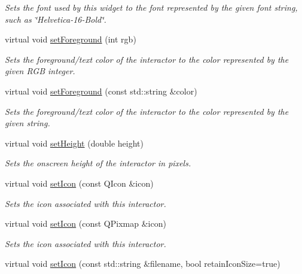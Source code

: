 \begin{DoxyCompactItemize}
\begin{DoxyCompactList}\small\item\em Sets the font used by this widget to the font represented by the given font string, such as \char`\"{}\+Helvetica-\/16-\/\+Bold\char`\"{}. \end{DoxyCompactList}\item 
virtual void \mbox{\hyperlink{classsgl_1_1GInteractor_a9eb856b5ff83a19df3831a31f15f4563}{set\+Foreground}} (int rgb)
\begin{DoxyCompactList}\small\item\em Sets the foreground/text color of the interactor to the color represented by the given R\+GB integer. \end{DoxyCompactList}\item 
virtual void \mbox{\hyperlink{classsgl_1_1GInteractor_af59209aeadea6dfc6d97a2d8531f50e1}{set\+Foreground}} (const std\+::string \&color)
\begin{DoxyCompactList}\small\item\em Sets the foreground/text color of the interactor to the color represented by the given string. \end{DoxyCompactList}\item 
virtual void \mbox{\hyperlink{classsgl_1_1GInteractor_a9e280bfc4544dfaf8e4376c4e1a74357}{set\+Height}} (double height)
\begin{DoxyCompactList}\small\item\em Sets the onscreen height of the interactor in pixels. \end{DoxyCompactList}\item 
virtual void \mbox{\hyperlink{classsgl_1_1GInteractor_a542abfcd7261751352af129c7215ecda}{set\+Icon}} (const Q\+Icon \&icon)
\begin{DoxyCompactList}\small\item\em Sets the icon associated with this interactor. \end{DoxyCompactList}\item 
virtual void \mbox{\hyperlink{classsgl_1_1GInteractor_a368e1a338f84401c284506d03b1ba769}{set\+Icon}} (const Q\+Pixmap \&icon)
\begin{DoxyCompactList}\small\item\em Sets the icon associated with this interactor. \end{DoxyCompactList}\item 
virtual void \mbox{\hyperlink{classsgl_1_1GInteractor_a762e139aa311461c3984d3ad28293f64}{set\+Icon}} (const std\+::string \&filename, bool retain\+Icon\+Size=true)

\end{DoxyCompactItemize}
